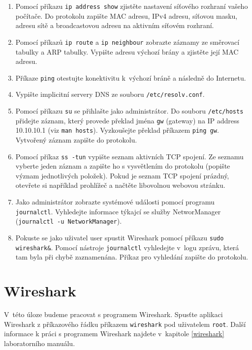 \documentclass[a4paper,11pt]{article}
\begin{document}
\begin{enumerate}
  \item Pomocí příkazu {\tt ip address show} zjistěte nastavení síťového rozhraní vašeho počítače. Do protokolu zapište MAC adresu, IPv4 adresu, síťovou masku, adresu sítě a broadcastovou adresu na aktivním síťovém rozhraní.
  \item Pomocí příkazů {\tt ip route} a {\tt ip neighbour} zobrazte záznamy ze směrovací tabulky a ARP tabulky. Vypište adresu výchozí brány a zjistěte její MAC adresu. 
  \item Příkaze {\tt ping} otestujte konektivitu k~výchozí bráně a následně do Internetu. 
  \item Vypište implicitní servery DNS ze souboru {\tt /etc/resolv.conf}.
  \item Pomocí příkazu {\tt su} se přihlašte jako administrátor. Do souboru {\tt /etc/hosts} přidejte záznam, který provede překlad jména {\tt gw} (gateway) na IP address 10.10.10.1 (viz {\tt man hosts}). Vyzkoušejte překlad příkazem {\tt ping gw}. Vytvořený záznam zapište do protokolu. 
  \item Pomocí příkaz {\tt ss -tun} vypište seznam aktivních TCP spojení. Ze seznamu vyberte jeden záznam a zapište ho s vysvětlením do protokolu (popište význam jednotlivých položek). Pokud je seznam TCP spojení prázdný, otevřete si například prohlížeč a načtěte libovolnou webovou stránku. 
  \item Jako administrátor zobrazte systémové události pomocí programu \texttt{journalctl}. Vyhledejte informace týkajcí se služby NetworManager ({\tt journalctl -u NetworkManager}).  
  \item Pokuste se jako uživatel user spustit Wireshark pomocí příkazu \texttt{sudo wireshark\&}. Pomocí nástroje {\tt journalctl} vyhledejte v~logu zprávu, která tam byla při chybě zaznamenána. Příkaz pro vyhledání zapište do protokolu. 
\end{enumerate}

\section{Wireshark}
V~této úloze budeme pracovat s programem Wireshark. Spusťte aplikaci Wireshark z příkazového řádku příkazem \texttt{wireshark}
pod uživatelem \texttt{root}. Další informace k práci s programem Wireshark najdete v~kapitole \ref{wireshark} laboratorního manuálu. 
\end{document}
